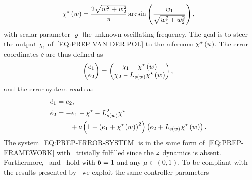 \begin{equation*}
   \chi^{\star} \left( w \right) = \frac{2 \sqrt{w_1^2 + w_2^2}}{\pi} \arcsin \left( \frac{w_1}{\sqrt{w_1^2 + w_2^2}} \right),
\end{equation*}
with scalar parameter $\varrho$ the unknown oscillating frequency.
The goal is to steer the output $\chi_1$ of~\eqref{EQ:PREP-VAN-DER-POL} to the reference $\chi^{\star}\left(w\right)$.
The error coordinates $\ee$ are thus defined as
\begin{equation*}
   \begin{pmatrix}
      e_1 \\ e_2
   \end{pmatrix} =
   \begin{pmatrix}
      \chi_1 - \chi^{\star}\left(w\right) \\ \chi_2 - L_{s\left(w\right)} \chi^{\star}\left(w\right)
   \end{pmatrix},
\end{equation*}
and the error system reads as
\begin{equation}%
   \label{EQ:PREP-ERROR-SYSTEM}
   \begin{split}
      & \dot{\ee}_1 = \ee_2, \\
      & \dot{\ee}_2 = -\ee_1 - \chi\s - L_{\wfun\lp\ww\rp}^2 \chi\s \\
      & \hspace{1.0cm} + a \lp 1 - \lp \ee_1 + \chi\s\lp\ww\rp\rp^2 \rp \lp \ee_2 + L_{\wfun\lp\ww\rp}\chi\s\lp\ww\rp \rp.
   \end{split}
\end{equation}
The system~\eqref{EQ:PREP-ERROR-SYSTEM} is in the same form of~\eqref{EQ:PREP-FRAMEWORK} with~ trivially fulfilled
since the $z$ dynamics is absent. Furthermore,~ and~
hold with $\boldsymbol{b} = 1$ and any $\mu \in (0,1)$. To be compliant with the results presented by~\cite{bin2020approximate} we exploit the same controller parameters
